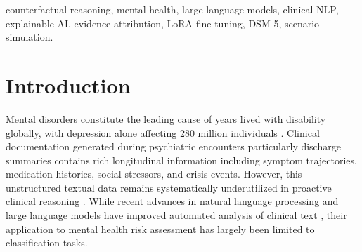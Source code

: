 \documentclass[conference]{IEEEtran}
\begin{document}
\begin{abstract}
Mental health crisis events including suicide attempts, psychotic breaks, and substance-induced decompensation often exhibit warning signs in clinical notes days or weeks prior, yet clinicians lack systematic tools to project potential adverse trajectories. Current AI systems focus on binary risk classification, failing to answer the critical question: ``If this patient deteriorates, what would that trajectory look like?'' This study aimed to develop an explainable counterfactual reasoning framework that generates plausible extreme mental health scenarios grounded in clinical evidence. We proposed a multi-stage pipeline comprising a fine-tuned large language model for clinical factor extraction, negation-aware safety signal detection, evidence-based scenario gating, Tree-of-Thoughts reasoning for parallel scenario generation, and post-hoc evidence attribution to trace generated content back to source text. The model was trained on 94,592 MIMIC-IV discharge summaries, achieving a cross-entropy loss of 1.706 and token-level accuracy of 67.5\%. Qualitative analysis demonstrated that the system successfully generates clinically coherent scenarios while identifying nexus factors evidence supporting multiple crisis pathways. This framework offers clinicians a preparedness-oriented tool that moves beyond risk scores to actionable scenario planning, potentially enabling earlier intervention in psychiatric care. The Codebase and implementation is made available at \href{https://github.com/lakshmidhatrigangavarapu/CFSP}{https://github.com/lakshmidhatrigangavarapu/CFSP} for reproducibility.
\end{abstract}

\begin{IEEEkeywords}
counterfactual reasoning, mental health, large language models, clinical NLP, explainable AI, evidence attribution, LoRA fine-tuning, DSM-5, scenario simulation.
\end{IEEEkeywords}

\section{Introduction}

Mental disorders constitute the leading cause of years lived with disability globally, with depression alone affecting 280 million individuals \cite{b1}. Clinical documentation generated during psychiatric encounters particularly discharge summaries contains rich longitudinal information including symptom trajectories, medication histories, social stressors, and crisis events. However, this unstructured textual data remains systematically underutilized in proactive clinical reasoning \cite{b2}. While recent advances in natural language processing and large language models have improved automated analysis of clinical text \cite{b3, b4}, their application to mental health risk assessment has largely been limited to classification tasks.
\end{document}
